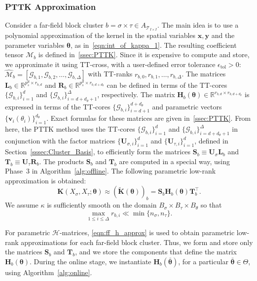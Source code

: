 \documentclass[final,3p,times]{elsarticle}
\newcommand{\mc}[1]{\mathcal{#1}}
\renewcommand{\vec}[1]{\boldsymbol{#1}}
\newcommand{\mat}[1]{\boldsymbol{#1}}
\newcommand{\R}{\mathbb{R}}
\newcommand{\ten}[1]{\boldsymbol{\mathcal{#1}}}
\newcommand{\tenh}[1]{\widehat{\boldsymbol{\mc{#1}}}}
\newcommand{\mathat}[1]{\widetilde{\boldsymbol{#1}}}
\begin{document}
\subsubsection{PTTK Approximation} Consider a far-field block cluster $b = \sigma \times \tau \in A_{\mc{T}_{I \times I}}$. The main idea is to use a polynomial approximation of the kernel in the spatial variables $\vec{x}, \vec{y}$ and the parameter variables $\vec{\theta}$, as in~\eqref{eqn:int_of_kappa_1}.  The resulting coefficient tensor $\ten{M}_{b}$ is defined in~\ref{ssec:PTTK}. Since it  is expensive to compute and store, we approximate it using TT-cross, with a user-defined error tolerance $\epsilon_{\mathrm{tol}} > 0$: 
$\tenh{M}_{b} = [\ten{G}_{b,1}, \ten{G}_{b,2}, \dots, \ten{G}_{b,\Delta}]$ with TT-ranks $r_{b,0}, r_{b,1},  \dots, r_{b,\Delta}$. The matrices $\mat{L}_{b} \in \R^{p_s^d \times r_{b,d}}$ and $\mat{R}_{b} \in \R^{p_s^d \times r_{b,d+d_{\theta}}}$  can be defined in terms of the TT-cores $\{\ten{G}_{b, i} \}_{i=1}^{d}$ and $\{\ten{G}_{b, i} \}_{i=d+d_{\theta} + 1}^{\Delta}$, respectively. The matrix $\mat{H}_{b}(\vec{\theta}) \in \R^{r_{b,d} \times r_{b,d+d_{\theta}}}$ is expressed in terms of the TT-cores $\{\ten{G}_{b, i} \}_{i=d + 1}^{d+d_{\theta}}$ and parametric vectors $\{\vec{v}_{i}(\theta_i)\}_{i=1}^{d_{\theta}}$. Exact formulas for these matrices are given in~\ref{ssec:PTTK}. From here, the PTTK method uses the TT-cores $\{\ten{G}_{b,i} \}_{i=1}^{d}$ and $\{\ten{G}_{b, i} \}_{i=d+d_{\theta} + 1}^{\Delta}$ in conjunction with the factor matrices $\{\mat{U}_{\sigma, i}\}_{i=1}^{d}$ and $\{\mat{U}_{\tau, i} \}_{i=1}^{d}$, defined in Section~\ref{sssec:Cluster_Basis}, to efficiently form the matrices  $\mat{S}_{b} \equiv \mat{U}_\sigma\mat{L}_b$ and $\mat{T}_{b} \equiv \mat{U}_\tau\mat{R}_b$. The products $\mat{S}_{b}$ and $\mat{T}_b$ are computed in a special way, using Phase~3 in Algorithm~\ref{alg:offline}. The following parametric low-rank approximation is obtained:
\begin{equation}\label{eqn:ff_h_approx}
\mat{K}({X}_{\sigma}, {X}_{\tau}; {\vec{\theta}}) \approx (\mathat{K}(\vec\theta))_b =  \mat{S}_{b}\mat{H}_{b}(\vec{\theta})\mat{T}_{b}^{\top}.
\end{equation}
We assume  $\kappa$ is sufficiently smooth  on the domain $B_{\sigma} \times B_{\tau} \times B_{\theta}$ so that 
$$\max_{1 \le i \le \Delta}r_{b, i} \ll \min\{n_{\sigma}, n_{\tau} \}.$$





For parametric $\mc{H}$-matrices, \eqref{eqn:ff_h_approx} is used to obtain parametric low-rank approximations for each far-field block cluster. Thus, we  form and store only the matrices $\mat{S}_{b}$ and $\mat{T}_{b}$, and we store the components that define the matrix $\mat{H}_{b}(\vec{\theta})$. During the online stage, we instantiate $\mat{H}_{b}(\bar{\vec{\theta}})$, for a particular $\bar{\vec{\theta}} \in \Theta$, using Algorithm~\ref{alg:online}.
\end{document}
